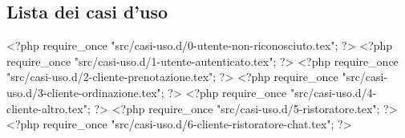 \pagebreak
\subsection{Lista dei casi d'uso}

<?php require_once "src/casi-uso.d/0-utente-non-riconosciuto.tex"; ?>
<?php require_once "src/casi-uso.d/1-utente-autenticato.tex"; ?>
<?php require_once "src/casi-uso.d/2-cliente-prenotazione.tex"; ?>
<?php require_once "src/casi-uso.d/3-cliente-ordinazione.tex"; ?>
<?php require_once "src/casi-uso.d/4-cliente-altro.tex"; ?>
<?php require_once "src/casi-uso.d/5-ristoratore.tex"; ?>
<?php require_once "src/casi-uso.d/6-cliente-ristoratore-chat.tex"; ?>
